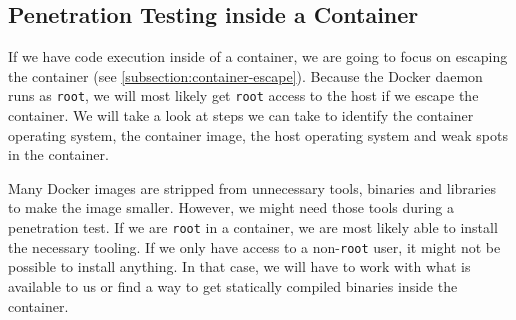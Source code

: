 \subsection{Penetration Testing inside a Container}\label{subsection:testing-container}
If we have code execution inside of a container, we are going to focus on escaping the container (see \autoref{subsection:container-escape}). Because the Docker daemon runs as \lstinline{root}, we will most likely get \lstinline{root} access to the host if we escape the container. We will take a look at steps we can take to identify the container operating system, the container image, the host operating system and weak spots in the container.

\medskip

Many Docker images are stripped from unnecessary tools, binaries and libraries to make the image smaller. However, we might need those tools during a penetration test. If we are \lstinline{root} in a container, we are most likely able to install the necessary tooling. If we only have access to a non-\lstinline{root} user, it might not be possible to install anything. In that case, we will have to work with what is available to us or find a way to get statically compiled binaries inside the container.









